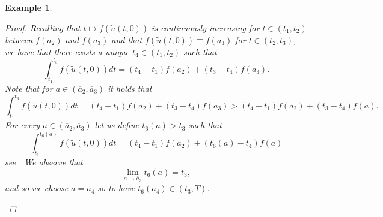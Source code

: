 \documentclass[a4paper, 10pt, final]{article}
\newtheorem{example}{Example}[section]
\begin{document}
\begin{example}
\begin{proof}
  Recalling that $t \mapsto f(\widetilde u(t,0))$ is continuously increasing for $t\in (t_1, t_2)$ between $f(a_2)$ and $f(a_3)$ and that $f(\widetilde u(t,0))\equiv f(a_3)$ for $t\in (t_2,t_3)$, we have that there exists  a unique $t_4\in (t_1,t_2)$ such that 
  \begin{equation}\label{tetto}
    \int_{t_1}^{t_3}f(\widetilde u(t,0))dt = (t_4-t_1)f(a_2)+(t_3-t_4)f(a_3).
  \end{equation}
  Note that for  $a\in (\overline a_2, \overline a_3)$ it holds that 
  \[
    \int_{t_1}^{t_3}f(\widetilde u(t,0))dt =(t_4-t_1)f(a_2)+(t_3-t_4)f(a_3)> (t_4-t_1)f(a_2)+ (t_3-t_4)f(a).
  \]
  For every 
  $a\in (\overline a_2, \overline a_3)$ 
  let us define
  $t_6(a)>t_3$ such that
  \begin{equation}\label{prova11}
    \int_{t_1}^{t_6(a)}
    f(\widetilde u(t, 0))dt =(t_4-t_1)f(a_2)+ (t_6(a)-t_4) f(a)
  \end{equation}
  see .
  We observe that 
  \begin{equation*}
      \lim_{a\to \overline a_3}t_6(a)=t_3,
  \end{equation*}
  and so we   choose $a=a_4$ so to have 
  $t_6(a_4)\in (t_3, T)$.
  \begin{figure}
    \centering 

\end{figure}
\end{proof}
\end{example}
\end{document}
